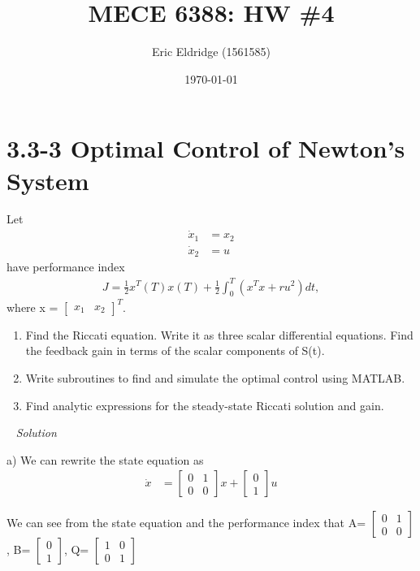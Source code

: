 \documentclass{article}
\title{MECE 6388: HW \#4}
\date{\today}
\author{Eric Eldridge (1561585)}
\begin{document}
 \maketitle

  \section{3.3-3 Optimal Control of Newton's System}

  Let 
  \begin{align*}
	  \dot{x}_1 &= x_2 \\
	  \dot{x}_2 &= u
  \end{align*}
  have performance index 
  \begin{align*}
	  J=\frac{1}{2}x^T(T)x(T)+\frac{1}{2}\int_0^T(x^Tx+ru^2)dt,
  \end{align*}
  where x = 
  $\begin{bmatrix}
	  x_1 & x_2 
  \end{bmatrix}^T$.
  \begin{enumerate}[label=(\alph*)]
    \item Find the Riccati equation. Write it as three scalar differential equations. Find the feedback gain in terms of the scalar components of S(t).
    \item Write subroutines to find and simulate the optimal control using MATLAB.
    \item Find analytic expressions for the steady-state Riccati solution and gain.
  \end{enumerate}
  
  \ 
  \newline
  \textit{Solution} \newline \newline
  
  a) We can rewrite the state equation as 
  \begin{align*}
	  \dot{x} &= 
	  \begin{bmatrix}
		  0 & 1 \\
		  0 & 0
	  \end{bmatrix}x + 
	  \begin{bmatrix}
		 0 \\
		 1 
	  \end{bmatrix}u
  \end{align*}

  We can see from the state equation and the performance index that A=
  $\begin{bmatrix}
	  0 & 1 \\
	  0 & 0
  \end{bmatrix}$, B=
  $\begin{bmatrix}
         0 \\
         1 
  \end{bmatrix}$, Q=
  $\begin{bmatrix}
	  1 & 0 \\
          0 & 1
  \end{bmatrix}$ \newline
\end{document}
